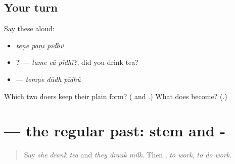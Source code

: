 \subsection*{Your turn}
Say these aloud:

\begin{itemize}
\raggedright
  \item \emph{teṇe pāṇī pīdhũ}
  \item \textbf{  ?} — \emph{tame cā pīdhī?}, did you drink tea?
  \item \textbf{  } — \emph{temṇe dūdh pīdhũ}
\end{itemize}

\begin{tcolorbox}[breakable,colback=teal!4,colframe=teal!35!black,title={Before you move on}]
Which two doers keep their plain form? (\textbf{} and \textbf{}.) What does \textbf{} become? (\textbf{}.)
\end{tcolorbox}
\section[\texorpdfstring{\gu{કર્યું} · \gu{આપ્યું} · \gu{જોયું} … (karyũ · āpyũ …)}{કર્યું · આપ્યું · જોયું … (karyũ · āpyũ …)}]{ — the regular past: stem and -}

\label{lesson:GU-C148-karyun}



\begin{quote}
Say \emph{she drank tea} and \emph{they drank milk}. Then \textbf{ }, \emph{to work}, \emph{to do work}.
\end{quote}

